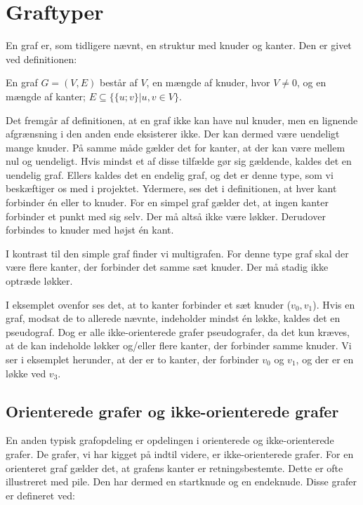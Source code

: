 \section{Graftyper}
En graf er, som tidligere nævnt, en struktur med knuder og kanter. Den er givet ved definitionen:
\begin{defn}
[Graf] 
En graf $G=(V,E)$ består af $V$, en mængde af knuder, hvor $V\neq0$, og en mængde af kanter; $E \subseteq \{\{u;v\}|u,v \in V\}$.
\end{defn}
Det fremgår af definitionen, at en graf ikke kan have nul knuder, men en lignende afgrænsning i den anden ende eksisterer ikke. Der kan dermed være uendeligt mange knuder. På samme måde gælder det for kanter, at der kan være mellem nul og uendeligt. Hvis mindst et af disse tilfælde gør sig gældende, kaldes det en uendelig graf. Ellers kaldes det en endelig graf, og det er denne type, som vi beskæftiger os med i projektet.
Ydermere, ses det i definitionen, at hver kant forbinder én eller to knuder. For en simpel graf gælder det, at ingen kanter forbinder et punkt med sig selv. Der må altså ikke være løkker. Derudover forbindes to knuder med højst én kant.



I kontrast til den simple graf finder vi multigrafen. For denne type graf skal der være flere kanter, der forbinder det samme sæt knuder. Der må stadig ikke optræde løkker.



I eksemplet ovenfor ses det, at to kanter forbinder et sæt knuder ($v_{0},v_{1}$). Hvis en graf, modsat de to allerede nævnte, indeholder mindst én løkke, kaldes det en pseudograf. Dog er alle ikke-orienterede grafer pseudografer, da det kun kræves, at de kan indeholde løkker og/eller flere kanter, der forbinder samme knuder. Vi ser i eksemplet herunder, at der er to kanter, der forbinder $v_{0}$ og $v_{1}$, og der er en løkke ved $v_{3}$.




\subsection{Orienterede grafer og ikke-orienterede grafer}
En anden typisk grafopdeling er opdelingen i orienterede og ikke-orienterede grafer. De grafer, vi har kigget på indtil videre, er ikke-orienterede grafer. For en orienteret graf gælder det, at grafens kanter er retningsbestemte. Dette er ofte illustreret med pile. Den har dermed en startknude og en endeknude. Disse grafer er defineret ved:

